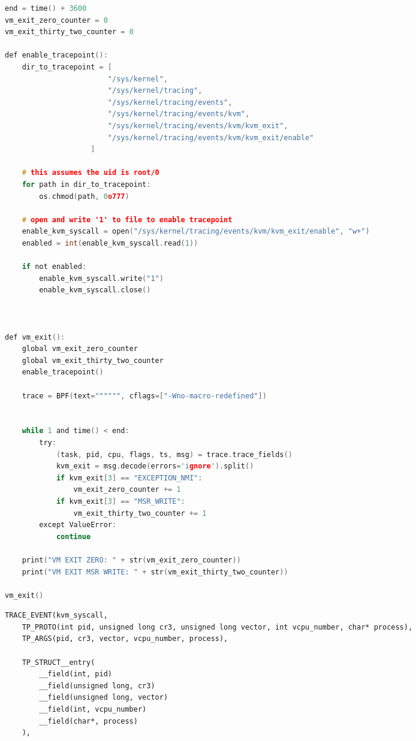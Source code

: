\documentclass{report}
\begin{document}
\begin{spacing}{1.5}
\begin{lstlisting}[caption={Source Code of VM-EXIT Counter},captionpos=b,language=c,firstnumber=1]
end = time() + 3600
vm_exit_zero_counter = 0
vm_exit_thirty_two_counter = 0

def enable_tracepoint():
    dir_to_tracepoint = [
                        "/sys/kernel", 
                        "/sys/kernel/tracing", 
                        "/sys/kernel/tracing/events", 
                        "/sys/kernel/tracing/events/kvm", 
                        "/sys/kernel/tracing/events/kvm/kvm_exit", 
                        "/sys/kernel/tracing/events/kvm/kvm_exit/enable"
                    ]

    # this assumes the uid is root/0
    for path in dir_to_tracepoint:
        os.chmod(path, 0o777)

    # open and write '1' to file to enable tracepoint
    enable_kvm_syscall = open("/sys/kernel/tracing/events/kvm/kvm_exit/enable", "w+")
    enabled = int(enable_kvm_syscall.read(1))

    if not enabled:
        enable_kvm_syscall.write("1")
        enable_kvm_syscall.close()
        
        
        
def vm_exit():
    global vm_exit_zero_counter
    global vm_exit_thirty_two_counter
    enable_tracepoint()

    trace = BPF(text="""""", cflags=["-Wno-macro-redefined"])
    
    
    while 1 and time() < end:
        try:
            (task, pid, cpu, flags, ts, msg) = trace.trace_fields()
            kvm_exit = msg.decode(errors='ignore').split()
            if kvm_exit[3] == "EXCEPTION_NMI":
                vm_exit_zero_counter += 1
            if kvm_exit[3] == "MSR_WRITE":
                vm_exit_thirty_two_counter += 1
        except ValueError:
            continue

    print("VM EXIT ZERO: " + str(vm_exit_zero_counter))
    print("VM EXIT MSR WRITE: " + str(vm_exit_thirty_two_counter))

vm_exit()
\end{lstlisting}



\begin{lstlisting}[caption={Implementation of KVM SYSCALL Linux Kernel Custom Tracepoint},captionpos=b]
TRACE_EVENT(kvm_syscall,
    TP_PROTO(int pid, unsigned long cr3, unsigned long vector, int vcpu_number, char* process),
    TP_ARGS(pid, cr3, vector, vcpu_number, process),

    TP_STRUCT__entry(
        __field(int, pid)
        __field(unsigned long, cr3)
        __field(unsigned long, vector)
        __field(int, vcpu_number)
        __field(char*, process)
    ),


\end{lstlisting}
\end{spacing}
\end{document}
